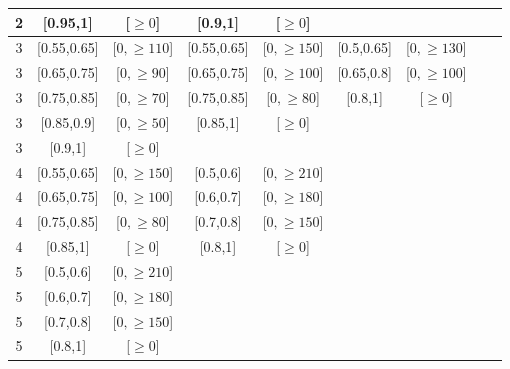 \begin{table}
\begin{adjustwidth}{-0.5in}{-1in}
\begin{tabular}{c|cc|cc|cc|cc|}
2 & [0.95,1] & [$\geq 0$]  &[0.9,1] & [$\geq 0$]  &  &   &  &   \\
\hline
3 & [0.55,0.65] & [$0,\geq 110$]  &[0.55,0.65] & [$0,\geq 150$]  &[0.5,0.65] & [$0,\geq 130$]  & &   \\
3 & [0.65,0.75] & [$0,\geq 90$]  &[0.65,0.75] & [$0,\geq 100$]  &[0.65,0.8] & [$0,\geq 100$]  & &   \\
3 & [0.75,0.85] & [$0,\geq 70$]  &[0.75,0.85] & [$0,\geq 80$]  &[0.8,1] & [$\geq 0$]  & &   \\
3 & [0.85,0.9] & [$0,\geq 50$]  &[0.85,1] & [$\geq 0$]  &  &   &  &   \\
3 & [0.9,1] & [$\geq 0$]  &  &   &   &   &  &   \\
\hline
4 & [0.55,0.65] & [$0,\geq 150$]  &[0.5,0.6] & [$0,\geq 210$]  &  &   &  &   \\
4 & [0.65,0.75] & [$0,\geq 100$]  &[0.6,0.7] & [$0,\geq 180$]  &  &   &  &   \\
4 & [0.75,0.85] & [$0,\geq 80$]  &[0.7,0.8] & [$0,\geq 150$]  &  &   &  &   \\
4 & [0.85,1] & [$\geq 0$]  &[0.8,1] & [$\geq 0$]  &  &   &  &   \\
\hline
5 & [0.5,0.6] & [$0,\geq 210$]  &  &   &   &   &  &   \\
5 & [0.6,0.7] & [$0,\geq 180$]  &  &   &   &   &  &   \\
5 & [0.7,0.8] & [$0,\geq 150$]  &  &   &   &   &  &   \\
5 & [0.8,1] & [$\geq 0$]  &  &   &   &   &  &   \\
\hline



\end{tabular}
\end{adjustwidth}
\end{table}

